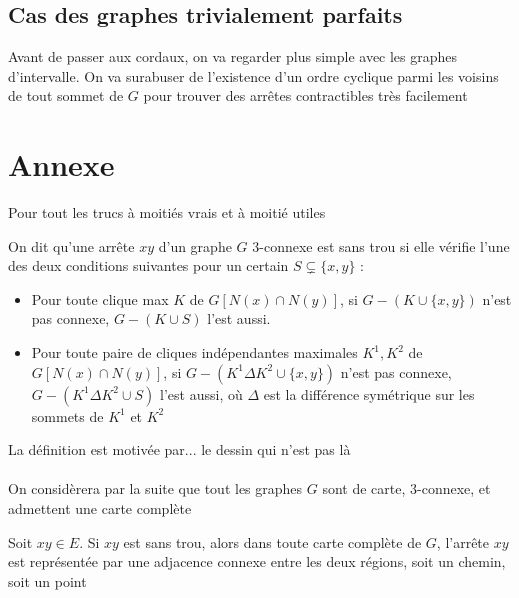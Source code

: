 \documentclass{scrartcl}
\begin{document}
\begin{flushleft}
\subsection{Cas des graphes trivialement parfaits}

Avant de passer aux cordaux, on va regarder plus simple avec les graphes d'intervalle. On va surabuser de l'existence d'un ordre
cyclique parmi les voisins de tout sommet de $G$ pour trouver des arrêtes contractibles très facilement

\section*{Annexe}

Pour tout les trucs à moitiés vrais et à moitié utiles


\begin{def*}
    On dit qu'une arrête $xy$ d'un graphe $G$ $3$-connexe est sans trou si elle vérifie l'une des deux conditions suivantes pour un certain
    $S \subsetneq \{x, y\}$ :
    \begin{itemize}
        \item Pour toute clique max $K$ de $G[N(x) \cap N(y)]$, si $G - (K \cup \{x,y\})$ n'est pas connexe, $G - (K \cup S)$ l'est aussi.
        \item Pour toute paire de cliques indépendantes maximales $K^1, K^2$ de $G[N(x) \cap N(y)]$, si $G - (K^1 \Delta K^2 \cup \{x,y\})$ n'est pas connexe,
        $G - (K^1 \Delta K^2 \cup S)$ l'est aussi, où $\Delta$ est la différence symétrique sur les sommets de $K^1$ et $K^2$
    \end{itemize}
\end{def*}

La définition est motivée par... le dessin qui n'est pas là
\\~\\
On considèrera par la suite que tout les graphes $G$ sont de carte, $3$-connexe, et admettent une carte complète

\begin{lem}\label{contrSanstrou}
    Soit $xy \in E$. Si $xy$ est sans trou, alors dans toute carte complète de $G$, l'arrête $xy$ est représentée par une adjacence
    connexe entre les deux régions, soit un chemin, soit un point
\end{lem}


\end{flushleft}
\end{document}

